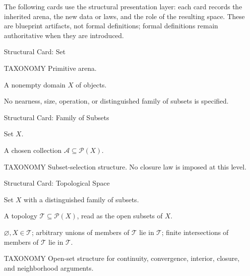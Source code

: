 \begin{remark*}
The following cards use the structural presentation layer: each card records
the inherited arena, the new data or laws, and the role of the resulting
space.  These are blueprint artifacts, not formal definitions; formal
definitions remain authoritative when they are introduced.

\begin{structureblueprint}{Structural Card: Set}
\begin{structuresection}{TAXONOMY}
Primitive arena.
\end{structuresection}
\begin{structurenew}
A nonempty domain \(X\) of objects.
\end{structurenew}
\begin{structuretheory}
No nearness, size, operation, or distinguished family of subsets is specified.
\end{structuretheory}
\end{structureblueprint}

\begin{structureblueprint}{Structural Card: Family of Subsets}
\begin{structureinherits}
Set \(X\).
\end{structureinherits}
\begin{structurenew}
A chosen collection \(\mathcal A\subseteq\mathcal P(X)\).
\end{structurenew}
\begin{structuresection}{TAXONOMY}
Subset-selection structure.  No closure law is imposed at this level.
\end{structuresection}
\end{structureblueprint}

\begin{structureblueprint}{Structural Card: Topological Space}
\begin{structureinherits}
Set \(X\) with a distinguished family of subsets.
\end{structureinherits}
\begin{structurenew}
A topology \(\mathcal T\subseteq\mathcal P(X)\), read as the open subsets of
\(X\).
\end{structurenew}
\begin{structuretheory}
\(\varnothing,X\in\mathcal T\); arbitrary unions of members of
\(\mathcal T\) lie in \(\mathcal T\); finite intersections of members of
\(\mathcal T\) lie in \(\mathcal T\).
\end{structuretheory}
\begin{structuresection}{TAXONOMY}
Open-set structure for continuity, convergence, interior, closure, and
neighborhood arguments.
\end{structuresection}
\end{structureblueprint}


\end{remark*}
